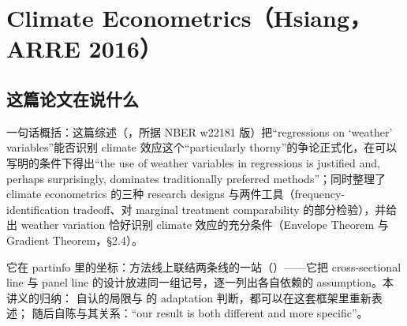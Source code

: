 
\chapter{Climate Econometrics（Hsiang，ARRE 2016）}
\label{ch:hsiang-2016}

\section{这篇论文在说什么}

一句话概括：这篇综述（\citealp{hsiang2016climate}，所据 NBER w22181 版）把``regressions on `weather' variables''\citep[第~2 页]{hsiang2016climate}能否识别 climate 效应这个``particularly thorny''\citep[第~2 页]{hsiang2016climate}的争论正式化，在可以写明的条件下得出``the use of weather variables in regressions is justified and, perhaps surprisingly, dominates traditionally preferred methods''\citep[第~2 页]{hsiang2016climate}；同时整理了 climate econometrics 的三种 research designs 与两件工具（frequency-identification tradeoff、对 marginal treatment comparability 的部分检验），并给出 weather variation 恰好识别 climate 效应的充分条件（Envelope Theorem 与 Gradient Theorem，\S 2.4）。

它在 partinfo 里的坐标：方法线上联结两条线的一站（）——它把 cross-sectional line 与 panel line 的设计放进同一组记号，逐一列出各自依赖的 assumption。本讲义的归纳： 自认的局限与  的 adaptation 判断，都可以在这套框架里重新表述； 随后自陈与其关系：``our result is both different and more specific''\citep[第~1217 页]{merel2021climate}。

